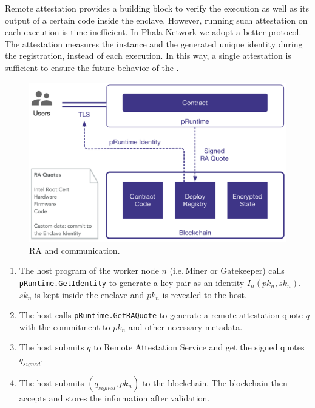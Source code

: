 Remote attestation provides a building block to verify the execution as well as its output of a certain code inside the enclave. However, running such attestation on each execution is time inefficient. In Phala Network we adopt a better protocol. The attestation measures the \pruntime instance and the generated unique identity during the registration, instead of each execution. In this way, a single attestation is sufficient to ensure the future behavior of the \pruntime.

\begin{figure}
    \centering \footnotesize
    \includegraphics[width=.7\columnwidth]{img/pLIBRA-communication}
    \caption{RA and communication. }
    \label{fig:communication}
\end{figure}

\begin{enumerate}
    \item The host program of the worker node $n$ (i.e.\,Miner or Gatekeeper) calls \texttt{pRuntime.GetIdentity} to generate a key pair as an identity $I_n(pk_n, sk_n)$.  $sk_n$ is kept inside the enclave and $pk_n$ is revealed to the host.

    \item The host calls \texttt{pRuntime.GetRAQuote} to generate a remote attestation quote $q$ with the commitment to $pk_n$ and other necessary metadata.

    \item The host submits $q$ to Remote Attestation Service and get the signed quotes $q_{signed}$.

    \item The host submits $(q_{signed}, pk_n)$ to the blockchain. The blockchain then accepts and stores the information after validation.
\end{enumerate}

